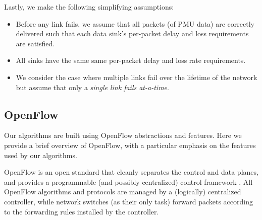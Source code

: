 
Lastly, we make the following simplifying assumptions:
\begin{itemize}

	\item Before any link fails, we assume that all packets (of PMU data) are correctly delivered such that each data sink's per-packet delay and loss requirements are satisfied.

	\item All sinks have the same same per-packet delay and loss rate requirements.  

	\item We consider the case where multiple links fail over the lifetime of the network but assume that only a \emph{single link fails at-a-time}.


\end{itemize}


\subsection{OpenFlow}
\label{subsec:openflow}

Our algorithms are built using OpenFlow abstractions and features. Here we provide a brief overview of OpenFlow, with a particular emphasis on the features used by our algorithms.

OpenFlow is an open standard that cleanly separates the control and data planes, and provides a programmable (and possibly centralized) control framework \cite{OpenFlow08}.
All OpenFlow algorithms and protocols are managed by a (logically) centralized controller, while network switches (as their only task) forward packets according to the 
forwarding rules installed by the controller.  

